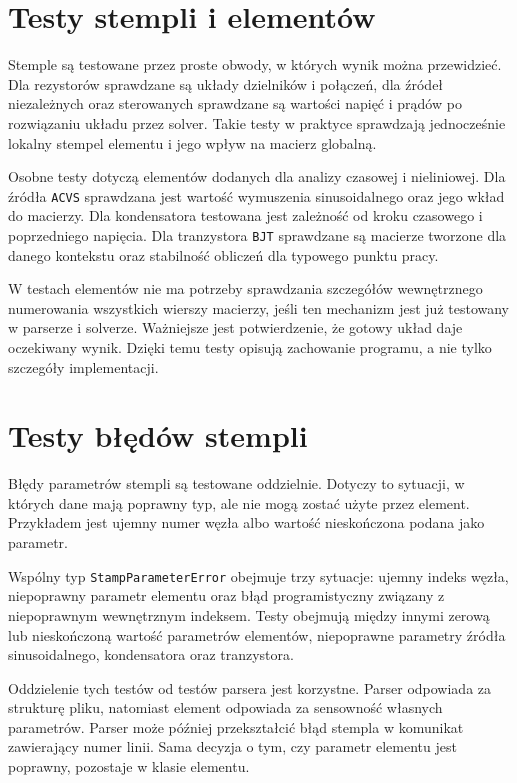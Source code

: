 \section{Testy stempli i elementów}
\label{sec:testy-stempli}

Stemple są testowane przez proste obwody, w których wynik można przewidzieć. Dla rezystorów sprawdzane są układy dzielników i połączeń, dla źródeł niezależnych oraz sterowanych sprawdzane są wartości napięć i prądów po rozwiązaniu układu przez solver. Takie testy w praktyce sprawdzają jednocześnie lokalny stempel elementu i jego wpływ na macierz globalną.

Osobne testy dotyczą elementów dodanych dla analizy czasowej i nieliniowej. Dla źródła \texttt{ACVS} sprawdzana jest wartość wymuszenia sinusoidalnego oraz jego wkład do macierzy. Dla kondensatora testowana jest zależność od kroku czasowego i poprzedniego napięcia. Dla tranzystora \texttt{BJT} sprawdzane są macierze tworzone dla danego kontekstu oraz stabilność obliczeń dla typowego punktu pracy.

W testach elementów nie ma potrzeby sprawdzania szczegółów wewnętrznego numerowania wszystkich wierszy macierzy, jeśli ten mechanizm jest już testowany w parserze i solverze. Ważniejsze jest potwierdzenie, że gotowy układ daje oczekiwany wynik. Dzięki temu testy opisują zachowanie programu, a nie tylko szczegóły implementacji.

\section{Testy błędów stempli}
\label{sec:testy-bledow-stempli}

Błędy parametrów stempli są testowane oddzielnie. Dotyczy to sytuacji, w których dane mają poprawny typ, ale nie mogą zostać użyte przez element. Przykładem jest ujemny numer węzła albo wartość nieskończona podana jako parametr.

Wspólny typ \texttt{StampParameterError} obejmuje trzy sytuacje: ujemny indeks węzła, niepoprawny parametr elementu oraz błąd programistyczny związany z niepoprawnym wewnętrznym indeksem. Testy obejmują między innymi zerową lub nieskończoną wartość parametrów elementów, niepoprawne parametry źródła sinusoidalnego, kondensatora oraz tranzystora.

Oddzielenie tych testów od testów parsera jest korzystne. Parser odpowiada za strukturę pliku, natomiast element odpowiada za sensowność własnych parametrów. Parser może później przekształcić błąd stempla w komunikat zawierający numer linii. Sama decyzja o tym, czy parametr elementu jest poprawny, pozostaje w klasie elementu.

